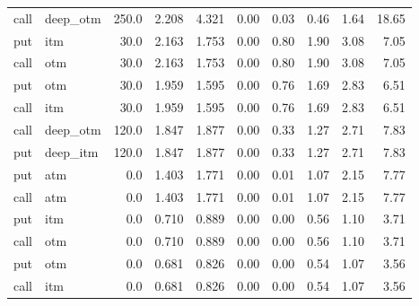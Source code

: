 \begin{longtable}{llrrrrrrrr}
 call &  deep\_otm &     250.0 &  2.208 &  4.321 &    0.00 &    0.03 &   0.46 &    1.64 &   18.65 \\
  put &       itm &      30.0 &  2.163 &  1.753 &    0.00 &    0.80 &   1.90 &    3.08 &    7.05 \\
 call &       otm &      30.0 &  2.163 &  1.753 &    0.00 &    0.80 &   1.90 &    3.08 &    7.05 \\
  put &       otm &      30.0 &  1.959 &  1.595 &    0.00 &    0.76 &   1.69 &    2.83 &    6.51 \\
 call &       itm &      30.0 &  1.959 &  1.595 &    0.00 &    0.76 &   1.69 &    2.83 &    6.51 \\
 call &  deep\_otm &     120.0 &  1.847 &  1.877 &    0.00 &    0.33 &   1.27 &    2.71 &    7.83 \\
  put &  deep\_itm &     120.0 &  1.847 &  1.877 &    0.00 &    0.33 &   1.27 &    2.71 &    7.83 \\
  put &       atm &       0.0 &  1.403 &  1.771 &    0.00 &    0.01 &   1.07 &    2.15 &    7.77 \\
 call &       atm &       0.0 &  1.403 &  1.771 &    0.00 &    0.01 &   1.07 &    2.15 &    7.77 \\
  put &       itm &       0.0 &  0.710 &  0.889 &    0.00 &    0.00 &   0.56 &    1.10 &    3.71 \\
 call &       otm &       0.0 &  0.710 &  0.889 &    0.00 &    0.00 &   0.56 &    1.10 &    3.71 \\
  put &       otm &       0.0 &  0.681 &  0.826 &    0.00 &    0.00 &   0.54 &    1.07 &    3.56 \\
 call &       itm &       0.0 &  0.681 &  0.826 &    0.00 &    0.00 &   0.54 &    1.07 &    3.56 \\
\end{longtable}
